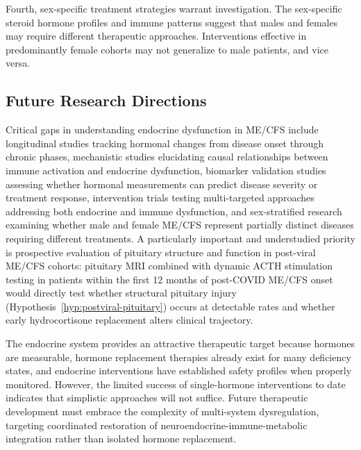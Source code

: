 Fourth, sex-specific treatment strategies warrant investigation. The sex-specific steroid hormone profiles and immune patterns suggest that males and females may require different therapeutic approaches. Interventions effective in predominantly female cohorts may not generalize to male patients, and vice versa.

\subsection{Future Research Directions}

Critical gaps in understanding endocrine dysfunction in ME/CFS include longitudinal studies tracking hormonal changes from disease onset through chronic phases, mechanistic studies elucidating causal relationships between immune activation and endocrine dysfunction, biomarker validation studies assessing whether hormonal measurements can predict disease severity or treatment response, intervention trials testing multi-targeted approaches addressing both endocrine and immune dysfunction, and sex-stratified research examining whether male and female ME/CFS represent partially distinct diseases requiring different treatments. A particularly important and understudied priority is prospective evaluation of pituitary structure and function in post-viral ME/CFS cohorts: pituitary MRI combined with dynamic ACTH stimulation testing in patients within the first 12 months of post-COVID ME/CFS onset would directly test whether structural pituitary injury (Hypothesis~\ref{hyp:postviral-pituitary}) occurs at detectable rates and whether early hydrocortisone replacement alters clinical trajectory.

The endocrine system provides an attractive therapeutic target because hormones are measurable, hormone replacement therapies already exist for many deficiency states, and endocrine interventions have established safety profiles when properly monitored. However, the limited success of single-hormone interventions to date indicates that simplistic approaches will not suffice. Future therapeutic development must embrace the complexity of multi-system dysregulation, targeting coordinated restoration of neuroendocrine-immune-metabolic integration rather than isolated hormone replacement.

